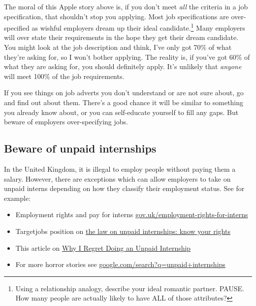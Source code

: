 \documentclass[
]{book}
\providecommand{\tightlist}{%
  \setlength{\itemsep}{0pt}\setlength{\parskip}{0pt}}
\begin{document}
The moral of this Apple story above is, if you don't meet \emph{all} the criteria in a job specification, that shouldn't stop you applying. Most job specifications are over-specified as wishful employers dream up their ideal candidate.\footnote{Using a relationship analogy, describe your ideal romantic partner. PAUSE. How many people are actually likely to have ALL of those attributes?} Many employers will over state their requirements in the hope they get their dream candidate. You might look at the job description and think, I've only got 70\% of what they're asking for, so I won't bother applying. The reality is, if you've got 60\% of what they are asking for, you should definitely apply. It's unlikely that \emph{anyone} will meet 100\% of the job requirements.

If you see things on job adverts you don't understand or are not sure about, go and find out about them. There's a good chance it will be similar to something you already know about, or you can self-educate yourself to fill any gaps. But beware of employers over-specifying jobs. 🤣

\hypertarget{unpaid}{%
\subsection{Beware of unpaid internships}\label{unpaid}}

In the United Kingdom, it is illegal to employ people without paying them a salary. However, there are exceptions which can allow employers to take on unpaid interns depending on how they classify their employment status. See for example:

\begin{itemize}
\tightlist
\item
  Employment rights and pay for interns \href{https://www.gov.uk/employment-rights-for-interns}{gov.uk/employment-rights-for-interns}
\item
  Targetjobs position on \href{https://targetjobs.co.uk/internships/advice/275017-the-law-on-unpaid-internships-know-your-rights}{the law on unpaid internships: know your rights}
\item
  This article on \href{https://www.ratemyplacement.co.uk/blog/why-i-regret-doing-an-unpaid-internship/}{Why I Regret Doing an Unpaid Internship} \citep{louiseregret}
\item
  For more horror stories see \href{https://www.google.com/search?q=unpaid+internships}{google.com/search?q=unpaid+internships}
\end{itemize}
\end{document}
